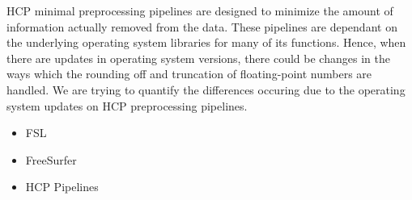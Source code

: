HCP minimal preprocessing pipelines are designed to minimize the amount of information actually removed from the data. These pipelines are dependant on the underlying operating system libraries for many of its functions. Hence, when there are updates in operating system versions, there could be changes in the ways which the rounding off and truncation of floating-point numbers are handled. We are trying to quantify the differences occuring due to the operating system updates on HCP preprocessing pipelines.\\

\begin{itemize}
 \item FSL
 \item FreeSurfer
 \item HCP Pipelines
\end{itemize}


